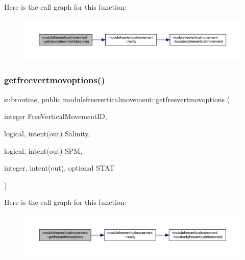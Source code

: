 Here is the call graph for this function\+:\nopagebreak
\begin{figure}[H]
\begin{center}
\leavevmode
\includegraphics[width=350pt]{namespacemodulefreeverticalmovement_a7aea36a1bc080954215034040adc4468_cgraph}
\end{center}
\end{figure}
\mbox{\label{namespacemodulefreeverticalmovement_aeb0cb26f03549d5f06df5b4559b58017}} 
\subsubsection{\texorpdfstring{getfreevertmovoptions()}{getfreevertmovoptions()}}
{\footnotesize\ttfamily subroutine, public modulefreeverticalmovement\+::getfreevertmovoptions (\begin{DoxyParamCaption}\item[{integer}]{Free\+Vertical\+Movement\+ID,  }\item[{logical, intent(out)}]{Salinity,  }\item[{logical, intent(out)}]{S\+PM,  }\item[{integer, intent(out), optional}]{S\+T\+AT }\end{DoxyParamCaption})}

Here is the call graph for this function\+:\nopagebreak
\begin{figure}[H]
\begin{center}
\leavevmode
\includegraphics[width=350pt]{namespacemodulefreeverticalmovement_aeb0cb26f03549d5f06df5b4559b58017_cgraph}
\end{center}
\end{figure}
\mbox{\label{namespacemodulefreeverticalmovement_a73edd544e82908b2861ea9c544516ab3}} 
